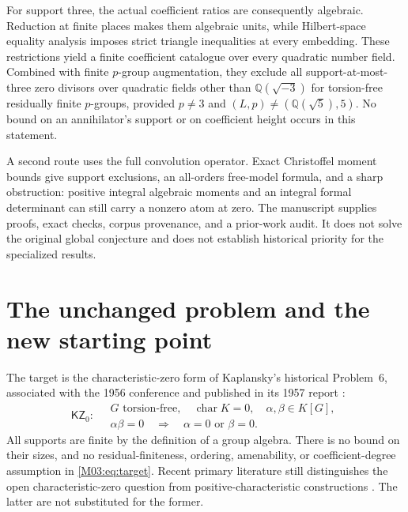 \documentclass[11pt,a4paper,oneside]{report}
\theoremstyle{definition}
\theoremstyle{remark}
\newcommand{\Q}{\mathbb Q}
\newcommand{\KZ}{\mathsf{KZ}_0}
\begin{document}
For support three, the actual coefficient ratios are consequently algebraic. Reduction at finite places makes them algebraic units, while Hilbert-space equality analysis imposes strict triangle inequalities at every embedding. These restrictions yield a finite coefficient catalogue over every quadratic number field. Combined with finite \(p\)-group augmentation, they exclude all support-at-most-three zero divisors over quadratic fields other than \(\Q(\sqrt{-3})\) for torsion-free residually finite \(p\)-groups, provided \(p\ne3\) and \((L,p)\ne(\Q(\sqrt5),5)\). No bound on an annihilator's support or on coefficient height occurs in this statement.

A second route uses the full convolution operator. Exact Christoffel moment bounds give support exclusions, an all-orders free-model formula, and a sharp obstruction: positive integral algebraic moments and an integral formal determinant can still carry a nonzero atom at zero. The manuscript supplies proofs, exact checks, corpus provenance, and a prior-work audit. It does not solve the original global conjecture and does not establish historical priority for the specialized results.
\medskip
\section{The unchanged problem and the new starting point}
The target is the characteristic-zero form of Kaplansky's historical Problem~6, associated with the 1956 conference and published in its 1957 report \cite{B:Kaplansky}:
\begin{equation}\label{M03:eq:target}
\boxed{\KZ:\quad
\begin{gathered}
G\text{ torsion-free},\quad \operatorname{char}K=0,\quad
\alpha,\beta\in K[G],\\
\alpha\beta=0\quad\Longrightarrow\quad \alpha=0\text{ or }\beta=0.
\end{gathered}}
\end{equation}
All supports are finite by the definition of a group algebra. There is no bound on their sizes, and no residual-finiteness, ordering, amenability, or coefficient-degree assumption in \eqref{M03:eq:target}. Recent primary literature still distinguishes the open characteristic-zero question from positive-characteristic constructions \cite{B:Ivanov}. The latter are not substituted for the former.
\end{document}
